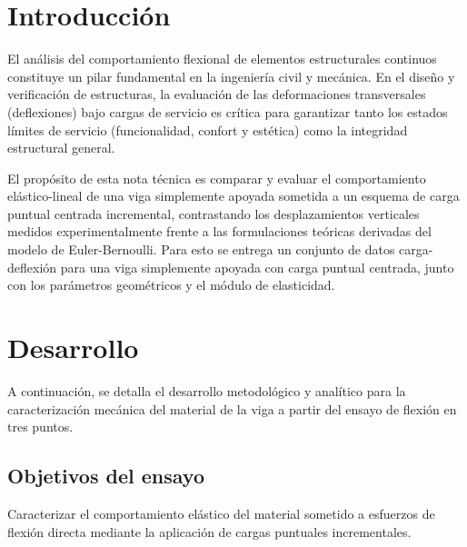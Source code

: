 
\begin{abstract}

Este documento provee de los datos y la información para realizar el análisis de la deflexión de una viga de sección rectangular cargada al centro. Esto se hace mediante el calculo teórico de la deflexión de la viga y luego se realiza la comparación con los datos proporcionados originalmente. Luego se analizan los resultados mediante la diferencia relativa, esto evalúa qué tan parecidos son los valores que se midieron en la realidad respecto a los calculados con la fórmula teórica, para finalizar con una interpretación de estos y la conclusión respecto a estos.
 
\end{abstract}

\section{Introducción}
El análisis del comportamiento flexional de elementos estructurales continuos constituye un pilar fundamental en la ingeniería civil y mecánica. En el diseño y verificación de estructuras, la evaluación de las deformaciones transversales (deflexiones) bajo cargas de servicio es crítica para garantizar tanto los estados límites de servicio (funcionalidad, confort y estética) como la integridad estructural general.

El propósito de esta nota técnica es comparar y evaluar el comportamiento elástico-lineal de una viga simplemente apoyada sometida a un esquema de carga puntual centrada incremental, contrastando los desplazamientos verticales medidos experimentalmente frente a las formulaciones teóricas derivadas del modelo de Euler-Bernoulli. Para esto se entrega un conjunto de datos carga-deflexión para una viga simplemente apoyada con carga puntual centrada, junto con los parámetros geométricos y el módulo de elasticidad. 


\section{Desarrollo}
A continuación, se detalla el desarrollo metodológico y analítico para la caracterización mecánica del material de la viga a partir del ensayo de flexión en tres puntos.

%
\subsection{Objetivos del ensayo}
Caracterizar el comportamiento elástico del material sometido a esfuerzos de flexión directa mediante la aplicación de cargas puntuales incrementales.
%

